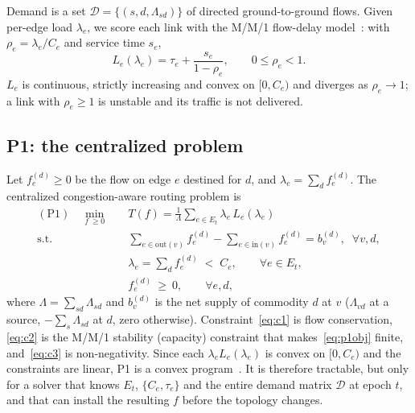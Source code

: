 \documentclass[conference]{IEEEtran}
\begin{document}
Demand is a set $\mathcal{D}=\{(s,d,\Lambda_{sd})\}$ of directed ground-to-ground flows. Given per-edge load $\lambda_e$, we score each link with the M/M/1 flow-delay model~\cite{kleinrock1975queueing}: with $\rho_e=\lambda_e/C_e$ and service time $s_e$,
\begin{equation}
L_e(\lambda_e)=\tau_e+\frac{s_e}{1-\rho_e},\qquad 0\le\rho_e<1 .
\label{eq:link}
\end{equation}
$L_e$ is continuous, strictly increasing and convex on $[0,C_e)$ and diverges as $\rho_e\to1$; a link with $\rho_e\ge1$ is unstable and its traffic is not delivered.

\subsection{P1: the centralized problem}
Let $f^{(d)}_e\ge0$ be the flow on edge $e$ destined for $d$, and $\lambda_e=\sum_d f^{(d)}_e$. The centralized congestion-aware routing problem is
\begin{align}
(\mathrm{P1})\quad \min_{f\ \ge 0}\quad & T(f)=\frac{1}{\Lambda}\sum_{e\in E_t}\lambda_e\,L_e(\lambda_e) \label{eq:p1obj}\\
\text{s.t.}\quad & \sum_{e\in\mathrm{out}(v)}\! f^{(d)}_e-\!\!\sum_{e\in\mathrm{in}(v)}\! f^{(d)}_e = b^{(d)}_v,\;\;\forall v,d, \label{eq:c1}\\
& \lambda_e=\textstyle\sum_d f^{(d)}_e \;<\; C_e,\qquad\forall e\in E_t, \label{eq:c2}\\
& f^{(d)}_e\ \ge\ 0,\qquad\forall e,d, \label{eq:c3}
\end{align}
where $\Lambda=\sum_{sd}\Lambda_{sd}$ and $b^{(d)}_v$ is the net supply of commodity $d$ at $v$ ($\Lambda_{vd}$ at a source, $-\sum_s\Lambda_{sd}$ at $d$, zero otherwise). Constraint~\eqref{eq:c1} is flow conservation, \eqref{eq:c2} is the M/M/1 stability (capacity) constraint that makes~\eqref{eq:p1obj} finite, and~\eqref{eq:c3} is non-negativity. Since each $\lambda_e L_e(\lambda_e)$ is convex on $[0,C_e)$ and the constraints are linear, P1 is a convex program~\cite{bertsekas1992data}. It is therefore tractable, but only for a solver that knows $E_t$, $\{C_e,\tau_e\}$ and the entire demand matrix $\mathcal{D}$ at epoch $t$, and that can install the resulting $f$ before the topology changes.
\end{document}
